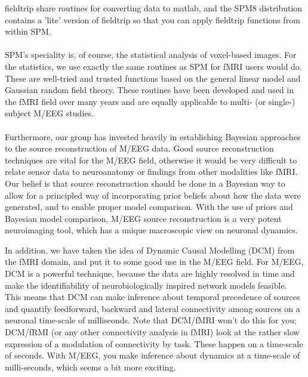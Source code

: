 fieldtrip share routines for converting data to matlab, and the SPM8
distribution contains a 'lite' version of fieldtrip so that you can
apply fieldtrip functions from within SPM.
\\
\\
SPM's speciality is, of course, the statistical analysis of voxel-based
images. For the statistics, we use exactly the same routines as SPM
for fMRI users would do. These are well-tried and trusted functions
based on the general linear model and Gaussian random field theory.
These routines have been developed and used in the fMRI field over
many years and are equally applicable to multi- (or single-) subject
M/EEG studies.
\\
\\
Furthermore, our group has invested heavily in establishing Bayesian
approaches to the source reconstruction of M/EEG data. Good source
reconstruction techniques are vital for the M/EEG field, otherwise it
would be very difficult to relate sensor data to neuroanatomy or
findings from other modalities like fMRI. Our belief is that source
reconstruction should be done in a Bayesian way to allow for a
principled way of incorporating prior beliefs about how the data were
generated, and to enable proper model comparison. With the use of
priors and Bayesian model comparison, M/EEG source reconstruction is a
very potent neuroimaging tool, which has a unique macroscopic view on
neuronal dynamics.

In addition, we have taken the idea of Dynamic Causal Modelling (DCM)
from the fMRI domain, and put it to some good use in the M/EEG field. For
M/EEG, DCM is a powerful technique, because the data are highly
resolved in time and make the identifiability of neurobiologically
inspired network models feasible. This means that DCM can make
inference about temporal precedence of sources and quantify
feedforward, backward and lateral connectivity among sources on a
neuronal time-scale of milliseonds. Note that DCM/fMRI won't do this
for you; DCM/fRMI (or any other connectivity analysis in fMRI)
look at the rather slow expression of a modulation of connectivity by
task. These happen on a time-scale of seconds. With M/EEG, you make
inference about dynamics at a time-scale of milli-seconds, which seems
a bit more exciting.

